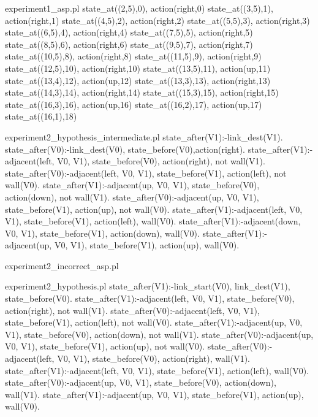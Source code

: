 \begin{filecontents*}{experiment1_asp.pl}
state_at((2,5),0), action(right,0)
state_at((3,5),1), action(right,1)
state_at((4,5),2), action(right,2)
state_at((5,5),3), action(right,3)
state_at((6,5),4), action(right,4)
state_at((7,5),5), action(right,5)
state_at((8,5),6), action(right,6)
state_at((9,5),7), action(right,7)
state_at((10,5),8), action(right,8)
state_at((11,5),9), action(right,9)
state_at((12,5),10), action(right,10)
state_at((13,5),11), action(up,11)
state_at((13,4),12), action(up,12)
state_at((13,3),13), action(right,13)
state_at((14,3),14), action(right,14)
state_at((15,3),15), action(right,15)
state_at((16,3),16), action(up,16)
state_at((16,2),17), action(up,17)
state_at((16,1),18)
\end{filecontents*}

\begin{filecontents*}{experiment2_hypothesis_intermediate.pl}
state_after(V1):-link_dest(V1).
state_after(V0):-link_dest(V0), state_before(V0),action(right).
state_after(V1):-adjacent(left, V0, V1), state_before(V0), 
                 action(right), not wall(V1).
state_after(V0):-adjacent(left, V0, V1), state_before(V1), 
                 action(left), not wall(V0).
state_after(V1):-adjacent(up, V0, V1), state_before(V0), 
                 action(down), not wall(V1).
state_after(V0):-adjacent(up, V0, V1), state_before(V1), 
                 action(up), not wall(V0).
state_after(V1):-adjacent(left, V0, V1), state_before(V1), 
                 action(left), wall(V0).
state_after(V1):-adjacent(down, V0, V1), state_before(V1), 
                 action(down), wall(V0).
state_after(V1):-adjacent(up, V0, V1), state_before(V1), 
                 action(up), wall(V0).
\end{filecontents*}

\begin{filecontents*}{experiment2_incorrect_asp.pl}

\end{filecontents*}

\begin{filecontents*}{experiment2_hypothesis.pl}
state_after(V1):-link_start(V0), link_dest(V1), 
                 state_before(V0).
state_after(V1):-adjacent(left, V0, V1), state_before(V0),
                 action(right), not wall(V1).
state_after(V0):-adjacent(left, V0, V1), state_before(V1),
                 action(left), not wall(V0).
state_after(V1):-adjacent(up, V0, V1), state_before(V0),
                 action(down), not wall(V1).
state_after(V0):-adjacent(up, V0, V1), state_before(V1),
                 action(up), not wall(V0).
state_after(V0):-adjacent(left, V0, V1), state_before(V0),
                 action(right), wall(V1).
state_after(V1):-adjacent(left, V0, V1), state_before(V1),
                 action(left), wall(V0).
state_after(V0):-adjacent(up, V0, V1), state_before(V0),
                 action(down), wall(V1).
state_after(V1):-adjacent(up, V0, V1), state_before(V1),
                 action(up), wall(V0).
\end{filecontents*}

